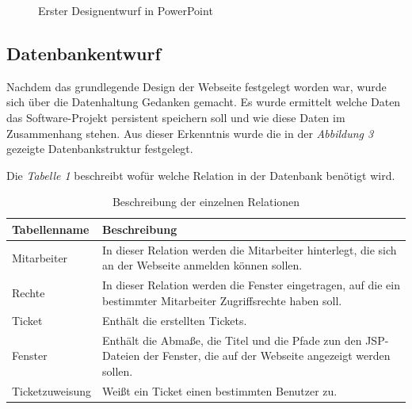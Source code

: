 \documentclass[12pt, a4paper]{article}
\begin{document}
\begin{figure}[H]
	\begin{center}
	\end{center}
	\caption{Erster Designentwurf in PowerPoint}
\end{figure}

\subsection{Datenbankentwurf}
Nachdem das grundlegende Design der Webseite festgelegt worden war, wurde sich über die Datenhaltung Gedanken gemacht. Es wurde ermittelt welche Daten das Software-Projekt persistent speichern soll und wie diese Daten im Zusammenhang stehen. Aus dieser Erkenntnis wurde die in der \textit{Abbildung 3} gezeigte Datenbankstruktur festgelegt.

Die \textit{Tabelle 1} beschreibt wofür welche Relation in der Datenbank benötigt wird.
\begin{table}[H]
	\begin{center}
		\begin{tabular}{|p{3cm}|p{10cm}|}
			\hline 
				\cellcolor{Hellgrau}Tabellenname & \cellcolor{Hellgrau}Beschreibung \\ 
			\hline 
				Mitarbeiter & In dieser Relation werden die Mitarbeiter hinterlegt, die sich an der Webseite anmelden können sollen.\\ 
			\hline
				Rechte & In dieser Relation werden die Fenster eingetragen, auf die ein bestimmter Mitarbeiter Zugriffsrechte haben soll.\\ 
			\hline
				Ticket & Enthält die erstellten Tickets.\\ 
			\hline
				Fenster & Enthält die Abmaße, die Titel und die Pfade zun den JSP-Dateien der Fenster, die auf der Webseite angezeigt werden sollen.\\ 
			\hline
				Ticketzuweisung & Weißt ein Ticket einen bestimmten Benutzer zu.\\ 
			\hline
		\end{tabular}
	\end{center}
	\caption{Beschreibung der einzelnen Relationen}
\end{table}
\end{document}
